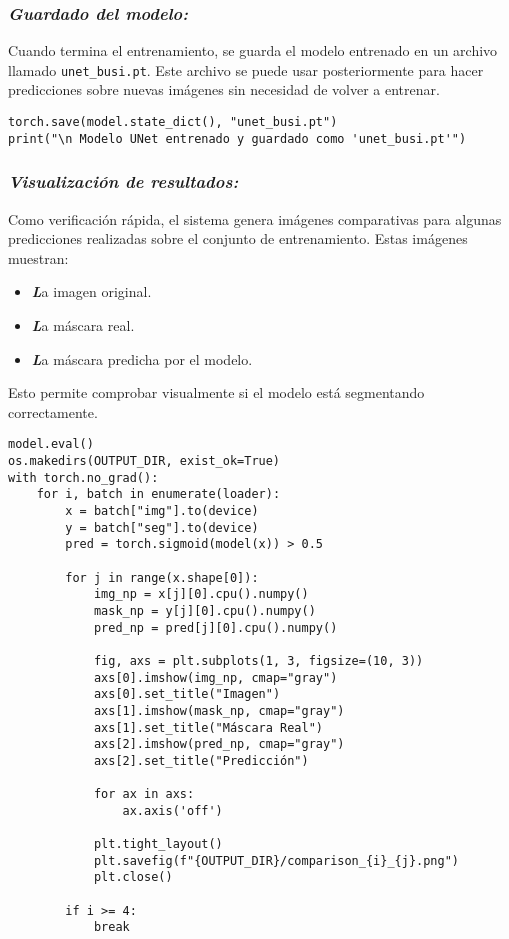 \documentclass[12pt]{article}
\begin{document}
\subsubsection{\textit{Guardado del modelo:}}
Cuando termina el entrenamiento, se guarda el modelo entrenado en un archivo llamado \texttt{unet\_busi.pt}.
Este archivo se puede usar posteriormente para hacer predicciones sobre nuevas imágenes sin necesidad de volver a entrenar.
\begin{lstlisting}[caption={Guardado del modelo}, label=lst:save_and_viz]
torch.save(model.state_dict(), "unet_busi.pt")
print("\n Modelo UNet entrenado y guardado como 'unet_busi.pt'")

\end{lstlisting}

\subsubsection{\textit{Visualización de resultados:}}
Como verificación rápida, el sistema genera imágenes comparativas para algunas predicciones realizadas sobre el conjunto de entrenamiento.
Estas imágenes muestran:
\begin{itemize}
    \item \textit\textbf La imagen original.
    \item \textit \textbf La máscara real.
    \item \textit \textbf La máscara predicha por el modelo.
\end{itemize}
Esto permite comprobar visualmente si el modelo está segmentando correctamente.
\begin{lstlisting}[caption={Generación de comparativas}, label=lst:save_and_viz]
model.eval()
os.makedirs(OUTPUT_DIR, exist_ok=True)
with torch.no_grad():
    for i, batch in enumerate(loader):
        x = batch["img"].to(device)
        y = batch["seg"].to(device)
        pred = torch.sigmoid(model(x)) > 0.5

        for j in range(x.shape[0]):
            img_np = x[j][0].cpu().numpy()
            mask_np = y[j][0].cpu().numpy()
            pred_np = pred[j][0].cpu().numpy()

            fig, axs = plt.subplots(1, 3, figsize=(10, 3))
            axs[0].imshow(img_np, cmap="gray")
            axs[0].set_title("Imagen")
            axs[1].imshow(mask_np, cmap="gray")
            axs[1].set_title("Máscara Real")
            axs[2].imshow(pred_np, cmap="gray")
            axs[2].set_title("Predicción")

            for ax in axs:
                ax.axis('off')

            plt.tight_layout()
            plt.savefig(f"{OUTPUT_DIR}/comparison_{i}_{j}.png")
            plt.close()

        if i >= 4:
            break
\end{lstlisting}
\end{document}
